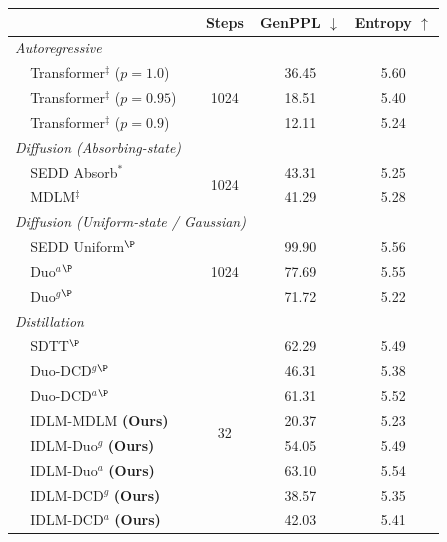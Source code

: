 \begin{table}[t!]
{      \begin{tabular}{llccc}
        \toprule
        &&  {\scriptsize Steps } & {\scriptsize GenPPL $\downarrow$} & {\scriptsize Entropy $\uparrow$} \\
        \midrule
        \multicolumn{3}{l}{\textit{Autoregressive}}\\
            & Transformer$^\ddag$ ($p=1.0$)  & \multirow{3}{*}{1024} & 36.45 & 5.60 \\
            & Transformer$^\ddag$ ($p=0.95$)  &  & 18.51 & 5.40 \\
            & Transformer$^\ddag$ ($p=0.9$)  &  & 12.11 & 5.24 \\
        \midrule
        \multicolumn{3}{l}{\textit{Diffusion (Absorbing-state)}}\\
            &SEDD Absorb$^*$~{\scriptsize \citep{lou2024discrete}} & \multirow{2}{*}{1024} & 43.31 & 5.25 \\
            &MDLM$^\ddag$~{\scriptsize \citep{sahoo2024simple}} &  & 41.29 & 5.28 \\
        \midrule
        \multicolumn{3}{l}{\textit{Diffusion (Uniform-state / Gaussian)}}\\
            & SEDD Uniform$^\P$~{\scriptsize \citep{lou2024discrete}} & \multirow{3}{*}{1024} & 99.90 & 5.56 \\
            & Duo$^a$$^\P$~{\scriptsize \citep{sahoo2025the}} &  & 77.69 & 5.55 \\
            & Duo$^g$$^\P$~{\scriptsize \citep{sahoo2025the}} &  & 71.72 & 5.22 \\
        \midrule
        \multicolumn{3}{l}{\textit{Distillation}}\\
            &   SDTT$^\P$~{\scriptsize \citep{deschenaux2024beyond}} &  \multirow{8}{*}{32} &  62.29 &  5.49 \\
            & Duo-DCD$^g$$^\P$~{\scriptsize \citep{sahoo2025the}}  &  &  46.31 & 5.38 \\ 
            & Duo-DCD$^a$$^\P$~{\scriptsize \citep{sahoo2025the}}  &  &  61.31 & 5.52 \\
            &IDLM-MDLM \textbf{(Ours)}  &  &  20.37 &  5.23 \\ 
            &IDLM-Duo$^g$ \textbf{(Ours)}  &  &  54.05 &  5.49 \\
             &IDLM-Duo$^a$ \textbf{(Ours)}  &  &  63.10 &  5.54 \\
            &IDLM-DCD$^g$ \textbf{(Ours)}  &  &  38.57 &  5.35 \\
            &IDLM-DCD$^a$ \textbf{(Ours)}  &  &  42.03 &  5.41 \\

\end{tabular}}
\end{table}
